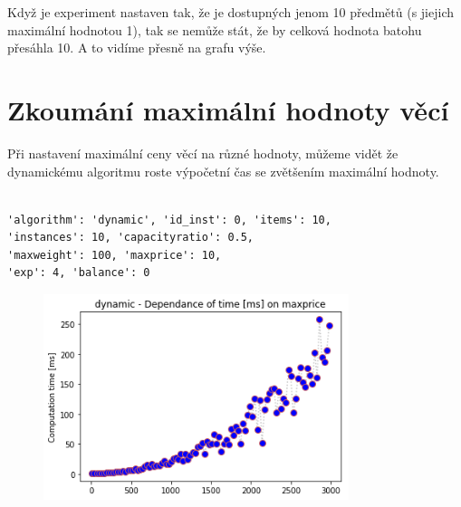 \documentclass[a4paper,10pt,twocolumn]{article}
\begin{document}
Když je experiment nastaven tak, že je dostupných jenom 10 předmětů (s jiejich maximální hodnotou 1), tak se nemůže stát, že by celková hodnota batohu přesáhla 10. A to vidíme přesně na grafu výše.






\section{Zkoumání maximální hodnoty věcí}


Při nastavení maximální ceny věcí na různé hodnoty, můžeme vidět že dynamickému algoritmu roste výpočetní čas se zvětšením maximální hodnoty.
   \begin{verbatim}

'algorithm': 'dynamic', 'id_inst': 0, 'items': 10,
'instances': 10, 'capacityratio': 0.5,
'maxweight': 100, 'maxprice': 10,
'exp': 4, 'balance': 0
\end{verbatim}

\begin{figure}[H]
  \begin{center}
    \includegraphics[height=6cm]{graphs/time_on_maxprice_dynamic.png}
  \end{center}
\end{figure}
\end{document}
